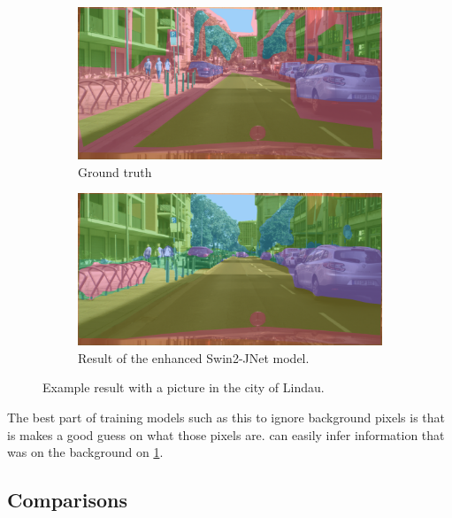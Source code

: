 \begin{figure}[h]
	\begin{subfigure}{.5\textwidth}
		\includegraphics[width=\textwidth]{city_images/swin2_no_background_gt_pic.png}
		\caption{Ground truth}
		\label{swin2_gt_image}
	\end{subfigure}
	\begin{subfigure}{.5\textwidth}
		\includegraphics[width=\textwidth]{city_images/swin2_no_background_pic.png}
		\caption{Result of the enhanced Swin2-JNet model.}
		\label{swin2_result_image}
	\end{subfigure}
	\caption{Example result with a picture in the city of Lindau.}
\end{figure}

The best part of training models such as this to ignore background pixels is that is makes a good guess on what those pixels are.
 can easily infer information that was on the background on \cref{swin2_gt_image}.

\newpage{}

\subsection{Comparisons}
\label{comparison_section}


